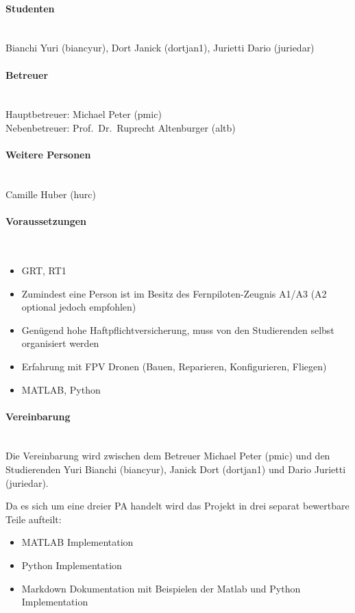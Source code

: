 \documentclass[a4paper,11pt]{scrartcl}
\begin{document}
\paragraph{Studenten}~\\
Bianchi Yuri (biancyur), Dort Janick (dortjan1), Jurietti Dario (juriedar)

\paragraph{Betreuer}~\\
Hauptbetreuer: Michael Peter (pmic)\\
Nebenbetreuer: Prof.\ Dr.\ Ruprecht Altenburger (altb)

\paragraph{Weitere Personen}~\\
Camille Huber (hurc)

\paragraph{Voraussetzungen}~\\
\begin{itemize}
	\item GRT, RT1
	\item Zumindest eine Person ist im Besitz des Fernpiloten-Zeugnis A1/A3 (A2 optional jedoch empfohlen)
	\item Genügend hohe Haftpflichtversicherung, muss von den Studierenden selbst organisiert werden
	\item Erfahrung mit FPV Dronen (Bauen, Reparieren, Konfigurieren, Fliegen)
	\item MATLAB, Python
\end{itemize}

\paragraph{Vereinbarung}~\\
Die Vereinbarung wird zwischen dem Betreuer Michael Peter (pmic) und den Studierenden Yuri Bianchi (biancyur), Janick Dort (dortjan1) und Dario Jurietti (juriedar).

Da es sich um eine dreier PA handelt wird das Projekt in drei separat bewertbare Teile aufteilt:
\begin{itemize}
	\item MATLAB Implementation
	\item Python Implementation
	\item Markdown Dokumentation mit Beispielen der Matlab und Python Implementation
\end{itemize}
\end{document}
